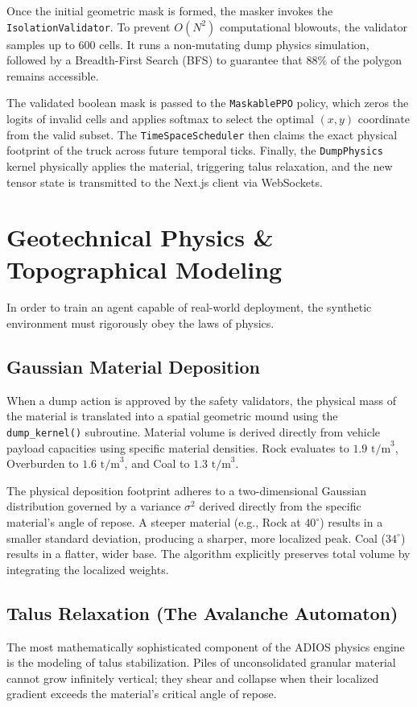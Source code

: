 \documentclass[conference]{IEEEtran}
\begin{document}
Once the initial geometric mask is formed, the masker invokes the \texttt{IsolationValidator}. To prevent $O(N^2)$ computational blowouts, the validator samples up to 600 cells. It runs a non-mutating dump physics simulation, followed by a Breadth-First Search (BFS) to guarantee that $88\%$ of the polygon remains accessible.

The validated boolean mask is passed to the \texttt{MaskablePPO} policy, which zeros the logits of invalid cells and applies softmax to select the optimal $(x,y)$ coordinate from the valid subset. The \texttt{TimeSpaceScheduler} then claims the exact physical footprint of the truck across future temporal ticks. Finally, the \texttt{DumpPhysics} kernel physically applies the material, triggering talus relaxation, and the new tensor state is transmitted to the Next.js client via WebSockets.

\section{Geotechnical Physics \& Topographical Modeling}

In order to train an agent capable of real-world deployment, the synthetic environment must rigorously obey the laws of physics.

\subsection{Gaussian Material Deposition}
When a dump action is approved by the safety validators, the physical mass of the material is translated into a spatial geometric mound using the \texttt{dump\_kernel()} subroutine. Material volume is derived directly from vehicle payload capacities using specific material densities. Rock evaluates to $1.9 \text{ t/m}^3$, Overburden to $1.6 \text{ t/m}^3$, and Coal to $1.3 \text{ t/m}^3$.

The physical deposition footprint adheres to a two-dimensional Gaussian distribution governed by a variance $\sigma^2$ derived directly from the specific material's angle of repose. A steeper material (e.g., Rock at $40^\circ$) results in a smaller standard deviation, producing a sharper, more localized peak. Coal ($34^\circ$) results in a flatter, wider base. The algorithm explicitly preserves total volume by integrating the localized weights.

\subsection{Talus Relaxation (The Avalanche Automaton)}
The most mathematically sophisticated component of the ADIOS physics engine is the modeling of talus stabilization. Piles of unconsolidated granular material cannot grow infinitely vertical; they shear and collapse when their localized gradient exceeds the material's critical angle of repose. 
\end{document}
